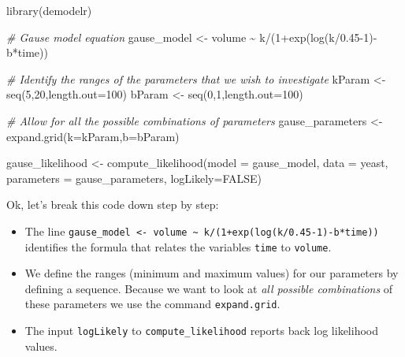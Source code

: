 \documentclass[
]{book}
\newenvironment{Shaded}{\begin{snugshade}}{\end{snugshade}}
\newcommand{\AttributeTok}[1]{\textcolor[rgb]{0.77,0.63,0.00}{#1}}
\newcommand{\CommentTok}[1]{\textcolor[rgb]{0.56,0.35,0.01}{\textit{#1}}}
\newcommand{\ConstantTok}[1]{\textcolor[rgb]{0.00,0.00,0.00}{#1}}
\newcommand{\DecValTok}[1]{\textcolor[rgb]{0.00,0.00,0.81}{#1}}
\newcommand{\FloatTok}[1]{\textcolor[rgb]{0.00,0.00,0.81}{#1}}
\newcommand{\FunctionTok}[1]{\textcolor[rgb]{0.00,0.00,0.00}{#1}}
\newcommand{\NormalTok}[1]{#1}
\newcommand{\OtherTok}[1]{\textcolor[rgb]{0.56,0.35,0.01}{#1}}
\newcommand{\SpecialCharTok}[1]{\textcolor[rgb]{0.00,0.00,0.00}{#1}}
\providecommand{\tightlist}{%
  \setlength{\itemsep}{0pt}\setlength{\parskip}{0pt}}
\theoremstyle{definition}
\theoremstyle{definition}
\theoremstyle{definition}
\theoremstyle{remark}
\begin{document}
\begin{Shaded}
\begin{Highlighting}[]
\FunctionTok{library}\NormalTok{(demodelr)}

\CommentTok{\# Gause model equation}
\NormalTok{gause\_model }\OtherTok{\textless{}{-}}\NormalTok{ volume }\SpecialCharTok{\textasciitilde{}}\NormalTok{ k}\SpecialCharTok{/}\NormalTok{(}\DecValTok{1}\SpecialCharTok{+}\FunctionTok{exp}\NormalTok{(}\FunctionTok{log}\NormalTok{(k}\SpecialCharTok{/}\FloatTok{0.45}\DecValTok{{-}1}\NormalTok{)}\SpecialCharTok{{-}}\NormalTok{b}\SpecialCharTok{*}\NormalTok{time))}


\CommentTok{\# Identify the ranges of the parameters that we wish to investigate}
\NormalTok{kParam }\OtherTok{\textless{}{-}} \FunctionTok{seq}\NormalTok{(}\DecValTok{5}\NormalTok{,}\DecValTok{20}\NormalTok{,}\AttributeTok{length.out=}\DecValTok{100}\NormalTok{)}
\NormalTok{bParam }\OtherTok{\textless{}{-}} \FunctionTok{seq}\NormalTok{(}\DecValTok{0}\NormalTok{,}\DecValTok{1}\NormalTok{,}\AttributeTok{length.out=}\DecValTok{100}\NormalTok{)}


\CommentTok{\# Allow for all the possible combinations of parameters}
\NormalTok{gause\_parameters }\OtherTok{\textless{}{-}} \FunctionTok{expand.grid}\NormalTok{(}\AttributeTok{k=}\NormalTok{kParam,}\AttributeTok{b=}\NormalTok{bParam)}
 

\NormalTok{gause\_likelihood }\OtherTok{\textless{}{-}} \FunctionTok{compute\_likelihood}\NormalTok{(}\AttributeTok{model =}\NormalTok{ gause\_model,}
                                        \AttributeTok{data =}\NormalTok{ yeast,}
                                        \AttributeTok{parameters =}\NormalTok{ gause\_parameters,}
                                        \AttributeTok{logLikely=}\ConstantTok{FALSE}\NormalTok{) }
\end{Highlighting}
\end{Shaded}

Ok, let's break this code down step by step:

\begin{itemize}
\tightlist
\item
  The line \texttt{gause\_model\ \textless{}-\ volume\ \textasciitilde{}\ k/(1+exp(log(k/0.45-1)-b*time))} identifies the formula that relates the variables \texttt{time} to \texttt{volume}.
\item
  We define the ranges (minimum and maximum values) for our parameters by defining a sequence. Because we want to look at \emph{all possible combinations} of these parameters we use the command \texttt{expand.grid}.
\item
  The input \texttt{logLikely} to \texttt{compute\_likelihood} reports back log likelihood values.
\end{itemize}
\end{document}
